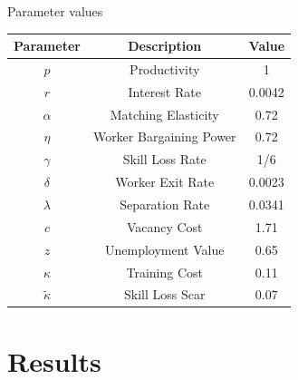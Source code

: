 \documentclass[9pt,xcolor={svgnames}]{beamer}
\begin{document}
\begin{frame}{Parameter values}
\begin{table}
\centering
 \begin{tabular}{|c | c | c|} 
 \hline
 \textbf{Parameter} & \textbf{Description} & \textbf{Value}\\  
 \hline
  $p$  & Productivity    & 1   \\ 
  $r$   & Interest Rate   & 0.0042  \\
  $\alpha$ & Matching Elasticity & 0.72  \\
  $\eta$ & Worker Bargaining Power  & 0.72  \\
  $\gamma$ & Skill Loss Rate & 1/6  \\   
 \hline
  $\delta$  & Worker Exit Rate    & 0.0023   \\ 
  $\lambda$  & Separation Rate    & 0.0341  \\
  $c$ & Vacancy Cost & 1.71  \\
  $z$ & Unemployment Value  & 0.65  \\
  $\kappa$  & Training Cost & 0.11  \\ 
  $ \tilde{\kappa}$  & Skill Loss Scar & 0.07  \\ [1ex]  
 \hline
 \end{tabular}
\end{table} 
\end{frame}


\section{Results} 
\end{document}

